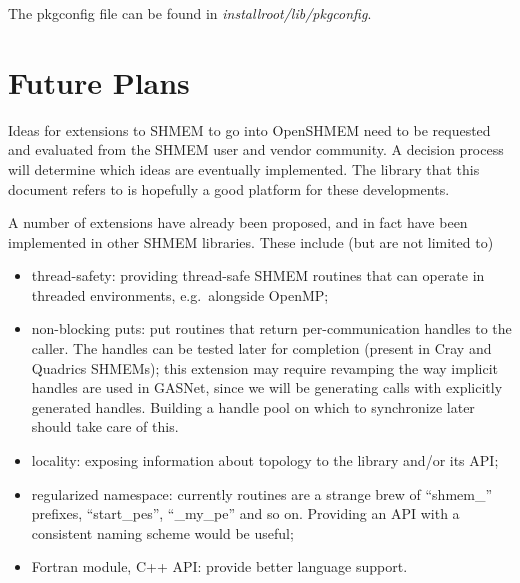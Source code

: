\documentclass[english]{article}
\begin{document}
The pkgconfig file can be found in \emph{installroot/lib/pkgconfig}.

\section{Future Plans}

Ideas for extensions to SHMEM to go into OpenSHMEM need to be
requested and evaluated from the SHMEM user and vendor community. A
decision process will determine which ideas are eventually
implemented. The library that this document refers to is hopefully a
good platform for these developments.

A number of extensions have already been proposed, and in fact have
been implemented in other SHMEM libraries. These include (but are not
limited to)

\begin{itemize}
\item thread-safety: providing thread-safe SHMEM routines that can
operate in threaded environments, e.g.\ alongside OpenMP;
\item non-blocking puts: put routines that return per-communication
handles to the caller. The handles can be tested later for completion
(present in Cray and Quadrics SHMEMs); this extension may require
revamping the way implicit handles are used in GASNet, since we will
be generating calls with explicitly generated handles. Building a
handle pool on which to synchronize later should take care of this.
\item locality: exposing information about topology to the library
and/or its API;
\item regularized namespace: currently routines are a strange brew of
``shmem\_'' prefixes, ``start\_pes'', ``\_my\_pe'' and so
on. Providing an API with a consistent naming scheme would be useful;
\item Fortran module, C++ API: provide better language support.
\end{itemize}
\end{document}
